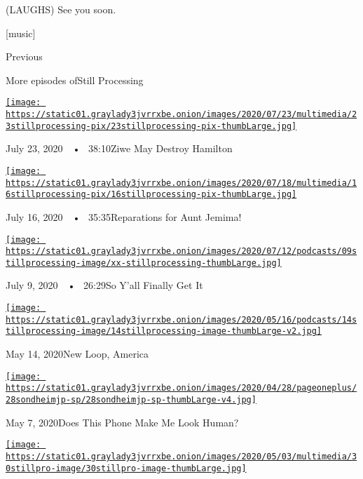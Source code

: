 (LAUGHS) See you soon.

{[}music{]}

Previous

More episodes ofStill Processing

\href{https://www.nytimes3xbfgragh.onion/2020/07/23/podcasts/hamilton-ziwe-discomfort.html?action=click\&module=audio-series-bar\&region=header\&pgtype=Article}{\texttt{[image: https://static01.graylady3jvrrxbe.onion/images/2020/07/23/multimedia/23stillprocessing-pix/23stillprocessing-pix-thumbLarge.jpg]}}

July 23, 2020~~•~ 38:10Ziwe May Destroy Hamilton

\href{https://www.nytimes3xbfgragh.onion/2020/07/16/podcasts/reparations-for-aunt-jemima.html?action=click\&module=audio-series-bar\&region=header\&pgtype=Article}{\texttt{[image: https://static01.graylady3jvrrxbe.onion/images/2020/07/18/multimedia/16stillprocessing-pix/16stillprocessing-pix-thumbLarge.jpg]}}

July 16, 2020~~•~ 35:35Reparations for Aunt Jemima!

\href{https://www.nytimes3xbfgragh.onion/2020/07/09/podcasts/still-processing-black-lives-matter.html?action=click\&module=audio-series-bar\&region=header\&pgtype=Article}{\texttt{[image: https://static01.graylady3jvrrxbe.onion/images/2020/07/12/podcasts/09stillprocessing-image/xx-stillprocessing-thumbLarge.jpg]}}

July 9, 2020~~•~ 26:29So Y'all Finally Get It

\href{https://www.nytimes3xbfgragh.onion/2020/05/14/podcasts/still-processing-westworld-hollywood-utopia-dystopia.html?action=click\&module=audio-series-bar\&region=header\&pgtype=Article}{\texttt{[image: https://static01.graylady3jvrrxbe.onion/images/2020/05/16/podcasts/14stillprocessing-image/14stillprocessing-image-thumbLarge-v2.jpg]}}

May 14, 2020New Loop, America

\href{https://www.nytimes3xbfgragh.onion/2020/05/07/podcasts/still-processing-internet-vulnerability-sondheim-parks-recreation.html?action=click\&module=audio-series-bar\&region=header\&pgtype=Article}{\texttt{[image: https://static01.graylady3jvrrxbe.onion/images/2020/04/28/pageoneplus/28sondheimjp-sp/28sondheimjp-sp-thumbLarge-v4.jpg]}}

May 7, 2020Does This Phone Make Me Look Human?

\href{https://www.nytimes3xbfgragh.onion/2020/04/30/podcasts/still-processing-fiona-apple-fetch-bolt-cutters.html?action=click\&module=audio-series-bar\&region=header\&pgtype=Article}{\texttt{[image: https://static01.graylady3jvrrxbe.onion/images/2020/05/03/multimedia/30stillpro-image/30stillpro-image-thumbLarge.jpg]}}

